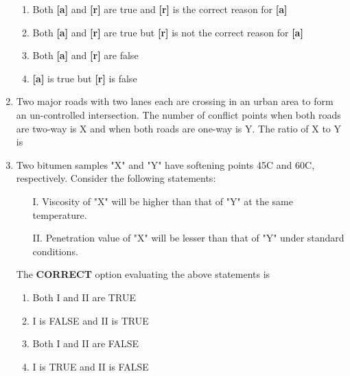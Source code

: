 \documentclass[journal]{IEEEtran}
\numberwithin{equation}{enumi}
\numberwithin{figure}{enumi}
\begin{document}
\begin{enumerate}
\begin{enumerate}
    \item Both \textbf{[a]} and \textbf{[r]} are true and \textbf{[r]} is the correct reason for \textbf{[a]}
    \item Both \textbf{[a]} and \textbf{[r]} are true but \textbf{[r]} is not the correct reason for \textbf{[a]}
    \item Both \textbf{[a]} and \textbf{[r]} are false
    \item \textbf{[a]} is true but \textbf{[r]} is false
\end{enumerate}

\item Two major roads with two lanes each are crossing in an urban area to form an un-controlled intersection. The number of conflict points when both roads are two-way is X and when both roads are one-way is Y. The ratio of X to Y is

\begin{enumerate}
\end{enumerate}

\item Two bitumen samples "X" and "Y" have softening points 45\degree C and 60\degree C, respectively. Consider the following statements:

\begin{enumerate}
    \item[I.] Viscosity of "X" will be higher than that of "Y" at the same temperature.
    \item[II.] Penetration value of "X" will be lesser than that of "Y" under standard conditions.
\end{enumerate}

The \textbf{CORRECT} option evaluating the above statements is

\begin{enumerate}
    \item Both I and II are TRUE
    \item I is FALSE and II is TRUE
    \item Both I and II are FALSE
    \item I is TRUE and II is FALSE
\end{enumerate}


\end{enumerate}
\end{document}
